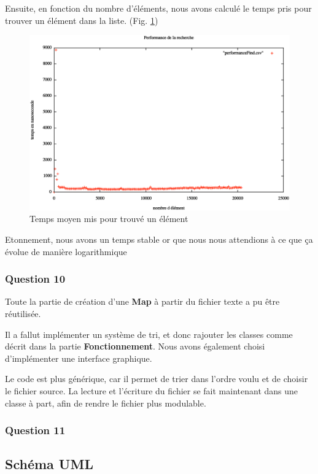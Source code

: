 \documentclass[a4paper]{article}
\begin{document}
Ensuite, en fonction du nombre d'éléments, nous avons calculé le temps pris pour trouver un élément dans la liste. (Fig. \ref{perfoFind})

\begin{figure} [H]
\begin{center}
\includegraphics[scale=0.4]{performanceFind.eps}
\caption{Temps moyen mis pour trouvé un élément}
\label{perfoFind}
\end{center}
\end{figure}

Etonnement, nous avons un temps stable or que nous nous attendions à ce que ça évolue de manière logarithmique

\subsubsection*{Question 10}

Toute la partie de création d'une \textbf{Map} à partir du fichier texte a pu être réutilisée.

 Il a fallut implémenter un système de tri, et donc rajouter les classes comme décrit dans la partie \textbf{Fonctionnement}. Nous avons également choisi d'implémenter une interface graphique.


Le code est plus générique, car il permet de trier dans l'ordre voulu et de choisir le fichier source. La lecture et l'écriture du fichier se fait maintenant dans une classe à part, afin de rendre le fichier plus modulable.

\subsubsection*{Question 11}


\subsection*{Schéma UML}
\end{document}
